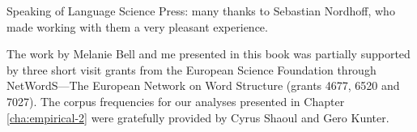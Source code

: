 \begin{refsection}
Speaking of Language Science Press: many thanks to Sebastian Nordhoff, who made working with them a very pleasant experience.

The work by Melanie Bell and me presented in this book was partially supported by
three short visit grants from the European Science Foundation through
NetWordS—The European Network on Word Structure (grants 4677, 6520 and
7027). The corpus frequencies for our analyses presented in Chapter
\ref{cha:empirical-2} were gratefully provided by Cyrus Shaoul and
Gero Kunter. 



\printbibliography[heading=subbibliography]
\end{refsection}

